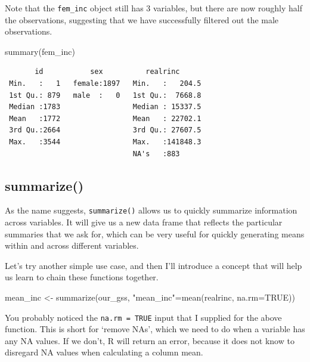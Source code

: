 \documentclass[
  letterpaper,
  DIV=11,
  numbers=noendperiod]{scrreprt}
\newenvironment{Shaded}{\begin{snugshade}}{\end{snugshade}}
\newcommand{\AttributeTok}[1]{\textcolor[rgb]{0.40,0.45,0.13}{#1}}
\newcommand{\ConstantTok}[1]{\textcolor[rgb]{0.56,0.35,0.01}{#1}}
\newcommand{\FunctionTok}[1]{\textcolor[rgb]{0.28,0.35,0.67}{#1}}
\newcommand{\NormalTok}[1]{\textcolor[rgb]{0.00,0.23,0.31}{#1}}
\newcommand{\OtherTok}[1]{\textcolor[rgb]{0.00,0.23,0.31}{#1}}
\newcommand{\StringTok}[1]{\textcolor[rgb]{0.13,0.47,0.30}{#1}}
\begin{document}
Note that the \texttt{fem\_inc} object still has 3 variables, but there
are now roughly half the observations, suggesting that we have
successfully filtered out the male observations.

\begin{Shaded}
\begin{Highlighting}[]
\FunctionTok{summary}\NormalTok{(fem\_inc)}
\end{Highlighting}
\end{Shaded}

\begin{verbatim}
       id           sex          realrinc       
 Min.   :   1   female:1897   Min.   :   204.5  
 1st Qu.: 879   male  :   0   1st Qu.:  7668.8  
 Median :1783                 Median : 15337.5  
 Mean   :1772                 Mean   : 22702.1  
 3rd Qu.:2664                 3rd Qu.: 27607.5  
 Max.   :3544                 Max.   :141848.3  
                              NA's   :883       
\end{verbatim}

\subsection{summarize()}\label{summarize}

As the name suggests, \texttt{summarize()} allows us to quickly
summarize information across variables. It will give us a new data frame
that reflects the particular summaries that we ask for, which can be
very useful for quickly generating means within and across different
variables.

Let's try another simple use case, and then I'll introduce a concept
that will help us learn to chain these functions together.

\begin{Shaded}
\begin{Highlighting}[]
\NormalTok{mean\_inc }\OtherTok{\textless{}{-}} \FunctionTok{summarize}\NormalTok{(our\_gss, }\StringTok{"mean\_inc"}\OtherTok{=}\FunctionTok{mean}\NormalTok{(realrinc, }\AttributeTok{na.rm=}\ConstantTok{TRUE}\NormalTok{))}
\end{Highlighting}
\end{Shaded}

\begin{tcolorbox}[enhanced jigsaw, left=2mm, title=\textcolor{quarto-callout-note-color}{\faInfo}\hspace{0.5em}{Note}, colframe=quarto-callout-note-color-frame, toptitle=1mm, bottomtitle=1mm, opacitybacktitle=0.6, titlerule=0mm, breakable, opacityback=0, coltitle=black, arc=.35mm, colback=white, leftrule=.75mm, toprule=.15mm, bottomrule=.15mm, colbacktitle=quarto-callout-note-color!10!white, rightrule=.15mm]

You probably noticed the \texttt{na.rm\ =\ TRUE} input that I supplied
for the above function. This is short for `remove NAs', which we need to
do when a variable has any NA values. If we don't, R will return an
error, because it does not know to disregard NA values when calculating
a column mean.

\end{tcolorbox}
\end{document}
